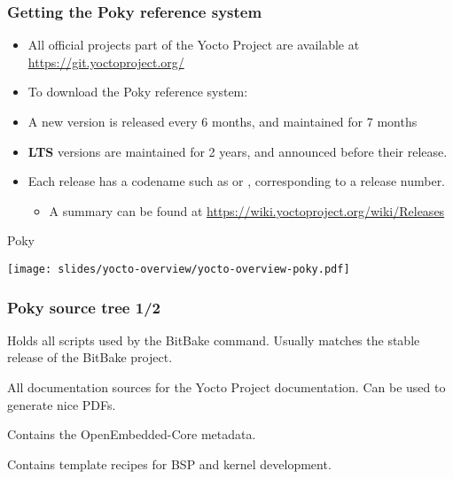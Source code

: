 \begin{frame}
  \frametitle{Getting the Poky reference system}
  \begin{itemize}
    \item All official projects part of the Yocto Project are
          available at \url{https://git.yoctoproject.org/}
    \item To download the Poky reference system: \\
          {\small
          }
    \item A new version is released every 6 months, and maintained for 7 months
    \item \textbf{LTS} versions are maintained for 2 years, and announced before their release.
    \item Each release has a codename such as  or ,
	  corresponding to a release number.
		  \begin{itemize}
			  \item A summary can be found at \url{https://wiki.yoctoproject.org/wiki/Releases}
		  \end{itemize}
  \end{itemize}
\end{frame}

\begin{frame}{Poky}
  \begin{center}
    \texttt{[image: slides/yocto-overview/yocto-overview-poky.pdf]}
  \end{center}
\end{frame}

\begin{frame}
  \frametitle{Poky source tree 1/2}
  \begin{description}[style=nextline]
  \item[bitbake/] Holds all scripts used by the BitBake command.
    Usually matches the stable release of the BitBake project.
  \item[documentation/] All documentation sources for the Yocto
    Project documentation. Can be used to generate nice PDFs.
  \item[meta/] Contains the OpenEmbedded-Core metadata.
  \item[meta-skeleton/] Contains template recipes for BSP and
    kernel development.
  \end{description}
\end{frame}

